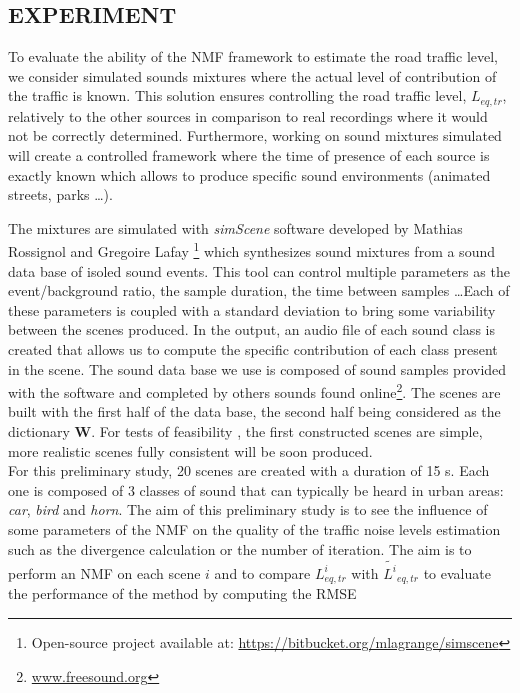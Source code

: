 \documentclass{article}
\begin{document}
\begin{sloppy}
\section{EXPERIMENT}\label{sec:experiment}

To evaluate the ability of the NMF framework to estimate the road traffic level, we consider simulated sounds mixtures where the actual level of contribution of the traffic is known. This solution ensures controlling the road traffic level, $L_{eq,tr}$, relatively to the other sources in comparison to real recordings where it would not be correctly determined. Furthermore, working on sound mixtures simulated will create a controlled framework where the time of presence of each source is exactly known which allows to produce specific sound environments (animated streets, parks \dots). 

The mixtures are simulated with \textit{simScene} software developed by Mathias Rossignol and Gregoire Lafay \cite{simScene}\footnote{Open-source project available at: \url{https://bitbucket.org/mlagrange/simscene}} which synthesizes sound mixtures from a sound data base of isoled sound events. This tool can control multiple parameters as the event/background ratio, the sample duration, the time between samples \dots Each of these parameters is coupled with a standard deviation to bring some variability between the scenes produced. In the output, an audio file of each sound class is created that allows us to compute the specific contribution of each class present in the scene. The sound data base we use is composed of sound samples provided with the software and completed by others sounds found online\footnote{\url{www.freesound.org}}. The scenes are built with the first half of the data base, the second half being considered as the dictionary $\mathbf{W}$. For tests of feasibility , the first constructed scenes are simple, more realistic scenes fully consistent will be soon produced.\\

For this preliminary study, 20 scenes are created with a duration of 15 s. Each one is composed of 3 classes of sound that can typically be heard in urban areas: \textit{car}, \textit{bird} and \textit{horn}. The aim of this preliminary study is to see the influence of some parameters of the NMF on the quality of the traffic noise levels estimation such as the divergence calculation or the number of iteration. The aim is to perform an NMF on each scene $i$ and to compare $L^i_{eq,tr}$ with $\tilde{L^i}_{eq,tr}$ to evaluate the performance of the method by computing the RMSE


\end{sloppy}
\end{document}
